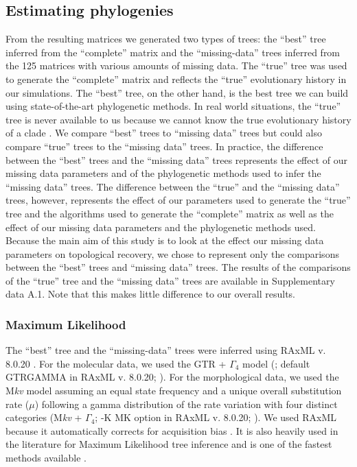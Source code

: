 \subsection{Estimating phylogenies}
\label{estimating_phylogenies}
From the resulting matrices we generated two types of trees: the ``best'' tree inferred from the ``complete'' matrix and the ``missing-data'' trees inferred from the 125 matrices with various amounts of missing data.
The ``true'' tree was used to generate the ``complete'' matrix and reflects the ``true'' evolutionary history in our simulations.
The ``best'' tree, on the other hand, is the best tree we can build using state-of-the-art phylogenetic methods.
In real world situations, the ``true'' tree is never available to us because we cannot know the true evolutionary history of a clade \citep[except in very rare circumstances, e.g.][]{rozen2005}.
We compare ``best'' trees to ``missing data'' trees but could also compare ``true'' trees to the ``missing data'' trees.
In practice, the difference between the ``best'' trees and the ``missing data'' trees represents the effect of our missing data parameters and of the phylogenetic methods used to infer the ``missing data'' trees.
The difference between the ``true'' and the ``missing data'' trees, however, represents the effect of our parameters used to generate the ``true'' tree and the algorithms used to generate the ``complete'' matrix as well as the effect of our missing data parameters and the phylogenetic methods used.
Because the main aim of this study is to look at the effect our missing data parameters on topological recovery, we chose to represent only the comparisons between the ``best'' trees and ``missing data'' trees.
The results of the comparisons of the ``true'' tree and the ``missing data'' trees are available in Supplementary data A.1. %
Note that this makes little difference to our overall results.

\subsubsection*{Maximum Likelihood}
The ``best'' tree and the ``missing-data'' trees were inferred using RAxML v. 8.0.20 \citep{Stamatakis21012014}. For the molecular data, we used the GTR + $\Gamma_4$ model (\citealp{tavare1986}; default GTRGAMMA in RAxML v. 8.0.20; \citealp{Stamatakis21012014}).
For the morphological data, we used the M\textit{kv} model \citep{lewisa2001} assuming an equal state frequency and a unique overall substitution rate ($\mu$) following a gamma distribution of the rate variation with four distinct categories (M\textit{kv} + $\Gamma_4$; -K MK option in RAxML v. 8.0.20; \citealp{Stamatakis21012014}).
We used RAxML because it automatically corrects for acquisition bias \citep{lewisa2001}. It is also heavily used in the literature for Maximum Likelihood tree inference \citep[e.g.][]{rouresite-specific2011,Bogdanowicz2012,springermacroevolutionary2012,O'Leary08022013,kellymolecular2014} and is one of the fastest methods available \citep{Stamatakis01102008}. 

